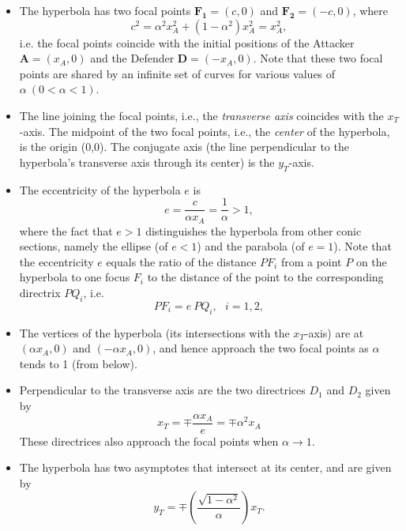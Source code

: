 \documentclass[final,5p,times,twocolumn]{elsarticle}
\begin{document}
\begin{itemize}
\item The hyperbola has two focal points $\boldsymbol{F_1}=(c,0)$ and $\boldsymbol{F_2}=(-c,0)$, where 
\begin{equation}
c^2= \alpha^2 x_A^2 + (1-\alpha^2)x_A^2=x_A^2,
\end{equation}
i.e. the focal points coincide with the initial positions of the Attacker $\boldsymbol{A}=(x_A,0)$ and the Defender $\boldsymbol{D}=(-x_A,0).$ Note that these two focal points are shared by an infinite set of curves for various values of $\alpha\ (0<\alpha<1)$. 
\item The line joining the  focal points, i.e., the \textit{transverse axis} coincides with the $x_T$-axis. The midpoint of the two focal points, i.e., the \textit{center} of the hyperbola, is the origin (0,0). The conjugate axis (the line perpendicular to the hyperbola's transverse axis through its center) is the $y_T$-axis.
\item The eccentricity of the hyperbola $e$ is
\begin{equation}
e=\dfrac{c}{\alpha x_A}=\dfrac{1}{\alpha}>1,
\end{equation}
where the fact that $e>1$ distinguishes the hyperbola from other conic sections, namely the ellipse (of $e<1$) and the parabola (of $e=1$). Note that the eccentricity $e$ equals the ratio of the distance $PF_i$ from a point $P$ on the hyperbola to one focus $F_i$ to the distance of the point to the corresponding directrix $PQ_i$, i.e.
\begin{equation}
PF_i = e\ PQ_i , \ \ \ i=1,2,
\end{equation}
\item The vertices of the hyperbola (its intersections with the $x_T$-axis) are at $(\alpha x_A,0)$ and $(-\alpha x_A,0)$, and hence approach the two focal points as $\alpha$ tends to 1 (from below).
\item Perpendicular to the transverse axis are the two directrices $D_1$ and $D_2$ given by
\begin{equation}
x_T = \mp \dfrac{\alpha x_A}{e} = \mp \alpha^2 x_A
\end{equation}
These directrices also approach the focal points when $\alpha\to1$.
\item The hyperbola has two asymptotes that intersect at its center, and are given by
\begin{equation}
y_T= \mp (\dfrac{\sqrt{1-\alpha^2}}{\alpha})x_T.
\end{equation}

\end{itemize}
\end{document}
